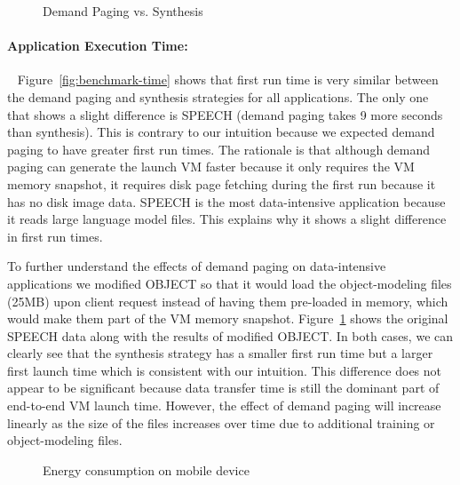 \begin{figure}
\centering
{}
\vspace{-0.2in}
\caption{Demand Paging vs. Synthesis}
\vspace{-0.2in}
\label{fig:demand_synthesis}
\end{figure}

\paragraph{Application Execution Time:}~
Figure~\ref{fig:benchmark-time} shows that first run time is
very similar between the demand paging and synthesis strategies for all
applications. The only one that shows a slight difference is SPEECH
(demand paging takes 9 more seconds than synthesis). This is contrary to
our intuition because we expected demand paging to have
greater first run times. The rationale is that although demand paging
can generate the launch VM faster because it only requires the VM memory snapshot,
it requires disk page fetching during the first
run because it has no disk image data. SPEECH is the most data-intensive
application because it reads large language model files.
This explains why it shows a slight difference in first run times.


To further understand the effects of demand paging on data-intensive 
applications we modified OBJECT so that it would load
the object-modeling files (25MB) upon client request instead of having 
them pre-loaded in memory, which would make them part of the VM memory 
snapshot. Figure~\ref{fig:demand_synthesis} shows the original SPEECH
data along with the results of modified OBJECT.
In both cases, we can clearly see that the synthesis strategy has a smaller
first run time but a larger first launch time which is consistent with our
intuition. This difference does not appear to be significant because 
data transfer time is still the dominant part of end-to-end VM launch time.
However, the effect of demand paging will increase linearly as the size of 
the files increases over time due to additional training or object-modeling
files. 

\begin{figure}
\vspace{-0.2in}
\caption{Energy consumption on mobile device}
\vspace{-0.2in}
\label{fig:benchmark-energy}
\end{figure}


